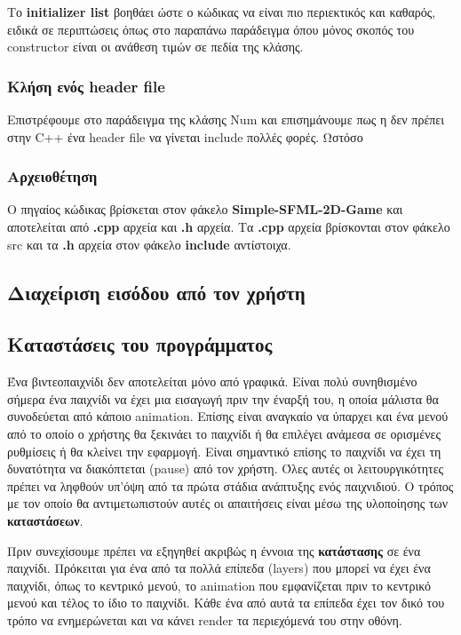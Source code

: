 \documentclass[12pt]{article}
\begin{document}
	Το \textbf{initializer list} βοηθάει ώστε ο κώδικας να είναι πιο περιεκτικός και καθαρός, ειδικά σε περιπτώσεις όπως στο παραπάνω παράδειγμα όπου μόνος σκοπός του constructor είναι οι ανάθεση τιμών σε πεδία της κλάσης.
		
	\subsubsection{Κλήση ενός header file}
	Επιστρέφουμε στο παράδειγμα της κλάσης Num και επισημάνουμε πως η δεν πρέπει στην C++ ένα header file να γίνεται include πολλές φορές. Ωστόσο 
		
		
	
	\subsubsection{Αρχειοθέτηση}
	
	Ο πηγαίος κώδικας βρίσκεται στον φάκελο \textbf{Simple-SFML-2D-Game} και αποτελείται από \textbf{.cpp} αρχεία και \textbf{.h} αρχεία. Τα \textbf{.cpp} αρχεία βρίσκονται στον φάκελο src και τα \textbf{.h} αρχεία στον φάκελο \textbf{include} αντίστοιχα. 
	
	

	
	
	
	
	\subsection{Διαχείριση εισόδου από τον χρήστη}
	
	\subsection{Καταστάσεις του προγράμματος}
	Ένα βιντεοπαιχνίδι δεν αποτελείται μόνο από γραφικά. Είναι πολύ συνηθισμένο σήμερα ένα παιχνίδι να έχει μια εισαγωγή πριν την έναρξή του, η οποία μάλιστα θα συνοδεύεται από κάποιο animation. Επίσης είναι αναγκαίο να ύπαρχει και ένα μενού από το οποίο ο χρήστης θα ξεκινάει το παιχνίδι ή θα επιλέγει ανάμεσα σε ορισμένες ρυθμίσεις ή θα κλείνει την εφαρμογή. Είναι σημαντικό επίσης το παιχνίδι να έχει τη δυνατότητα να διακόπτεται (pause) από τον χρήστη. Όλες αυτές οι λειτουργικότητες πρέπει να ληφθούν υπ'όψη από τα πρώτα στάδια ανάπτυξης ενός παιχνιδιού. Ο τρόπος με τον οποίο θα αντιμετωπιστούν αυτές οι απαιτήσεις είναι μέσω της υλοποίησης των \textbf{καταστάσεων}.
	
	Πριν συνεχίσουμε πρέπει να εξηγηθεί ακριβώς η έννοια της \textbf{κατάστασης} σε ένα παιχνίδι. Πρόκειται για ένα από τα πολλά επίπεδα (layers) που μπορεί να έχει ένα παιχνίδι, όπως το κεντρικό μενού, το animation που εμφανίζεται πριν το κεντρικό μενού και τέλος το ίδιο το παιχνίδι. Κάθε ένα από αυτά τα επίπεδα έχει τον δικό του τρόπο να ενημερώνεται και να κάνει render τα περιεχόμενά του στην οθόνη.
	
\end{document}

